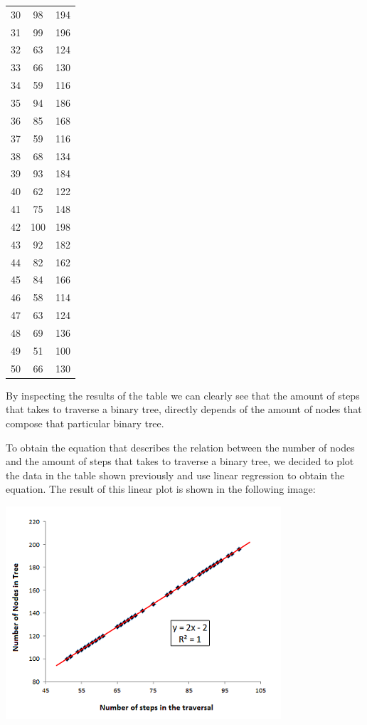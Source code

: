 \documentclass[12p]{article}
\begin{document}
\begin{table}[ht]
\begin{tabular}{c c c}
30 & 98 & 194 \\
31 & 99 & 196 \\
32 & 63 & 124 \\
33 & 66 & 130 \\
34 & 59 & 116 \\
35 & 94 & 186 \\
36 & 85 & 168 \\
37 & 59 & 116 \\
38 & 68 & 134 \\
39 & 93 & 184 \\
40 & 62 & 122 \\
41 & 75 & 148 \\
42 & 100 & 198 \\
43 & 92 & 182 \\
44 & 82 & 162 \\
45 & 84 & 166 \\
46 & 58 & 114 \\
47 & 63 & 124 \\
48 & 69 & 136 \\
49 & 51 & 100 \\
50 & 66 & 130 \\ 
\hline %
\end{tabular}

\label{table:nonlin} %
\end{table}

  \newpage 				%

\large By inspecting the results of the table we can clearly see that the amount of steps that takes to traverse a binary tree, directly depends of the amount of nodes that compose that particular binary tree. 

\bigskip

To obtain the equation that describes the relation between the number of nodes and the amount of steps that takes to traverse a binary tree, we decided to plot the data in the table shown previously and use linear regression to obtain the equation. The result of this linear plot is shown in the following image:


\includegraphics{Graph2}
\end{document}
